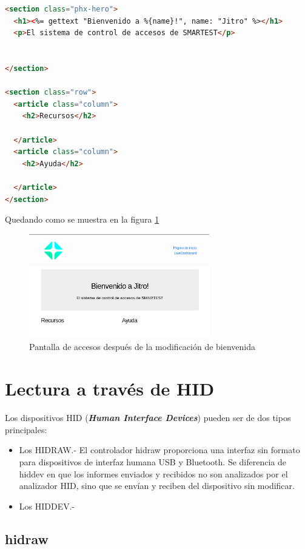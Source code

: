 \begin{lstlisting}[language=html]
<section class="phx-hero">
  <h1><%= gettext "Bienvenido a %{name}!", name: "Jitro" %></h1>
  <p>El sistema de control de accesos de SMARTEST</p>


</section>

<section class="row">
  <article class="column">
    <h2>Recursos</h2>

  </article>
  <article class="column">
    <h2>Ayuda</h2>

  </article>
</section>
\end{lstlisting}

Quedando como se muestra en la figura \ref{cap2:004}

\begin{figure}[htb]
\centering
\includegraphics[width=0.7\textwidth]{capitulo2/bienvenida.png}
\caption{Pantalla de accesos después de la modificación de bienvenida}
\label{cap2:004}
\end{figure}

\section{Lectura a través de HID}

Los dispositivos HID (\textbf{\emph{Human Interface Devices}}) pueden ser de dos tipos principales:

\begin{itemize}
\item Los HIDRAW.- El controlador hidraw proporciona una interfaz sin formato para dispositivos de interfaz humana USB y Bluetooth. Se diferencia de hiddev en que los informes enviados y recibidos no son analizados por el analizador HID, sino que se envían y reciben del dispositivo sin modificar.
\item Los HIDDEV.- 
\end{itemize}

\subsection{hidraw}

